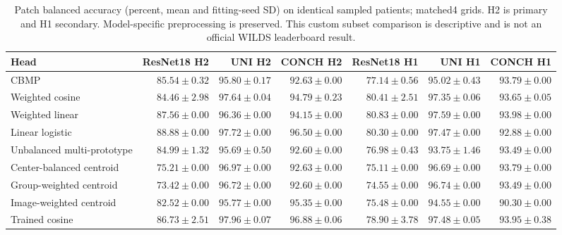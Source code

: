 \begin{table}[p]
\centering\small
\setlength{\tabcolsep}{3pt}
\begin{tabular}{lrrrrrr}
\hline
Head & ResNet18 H2 & UNI H2 & CONCH H2 & ResNet18 H1 & UNI H1 & CONCH H1 \\
\hline
CBMP & $85.54\pm0.32$ & $95.80\pm0.17$ & $92.63\pm0.00$ & $77.14\pm0.56$ & $95.02\pm0.43$ & $93.79\pm0.00$ \\
Weighted cosine & $84.46\pm2.98$ & $97.64\pm0.04$ & $94.79\pm0.23$ & $80.41\pm2.51$ & $97.35\pm0.06$ & $93.65\pm0.05$ \\
Weighted linear & $87.56\pm0.00$ & $96.36\pm0.00$ & $94.15\pm0.00$ & $80.83\pm0.00$ & $97.59\pm0.00$ & $93.98\pm0.00$ \\
Linear logistic & $88.88\pm0.00$ & $97.72\pm0.00$ & $96.50\pm0.00$ & $80.30\pm0.00$ & $97.47\pm0.00$ & $92.88\pm0.00$ \\
Unbalanced multi-prototype & $84.99\pm1.32$ & $95.69\pm0.50$ & $92.60\pm0.00$ & $76.98\pm0.43$ & $93.75\pm1.46$ & $93.49\pm0.00$ \\
Center-balanced centroid & $75.21\pm0.00$ & $96.97\pm0.00$ & $92.63\pm0.00$ & $75.11\pm0.00$ & $96.69\pm0.00$ & $93.79\pm0.00$ \\
Group-weighted centroid & $73.42\pm0.00$ & $96.72\pm0.00$ & $92.60\pm0.00$ & $74.55\pm0.00$ & $96.74\pm0.00$ & $93.49\pm0.00$ \\
Image-weighted centroid & $82.52\pm0.00$ & $95.77\pm0.00$ & $95.35\pm0.00$ & $75.48\pm0.00$ & $94.55\pm0.00$ & $90.30\pm0.00$ \\
Trained cosine & $86.73\pm2.51$ & $97.96\pm0.07$ & $96.88\pm0.06$ & $78.90\pm3.78$ & $97.48\pm0.05$ & $93.95\pm0.38$ \\
\hline
\end{tabular}
\caption{Patch balanced accuracy (percent, mean and fitting-seed SD) on identical sampled patients; matched4 grids. H2 is primary and H1 secondary. Model-specific preprocessing is preserved. This custom subset comparison is descriptive and is not an official WILDS leaderboard result.}
\label{tab:supp_matched4_balanced_accuracy}
\end{table}
